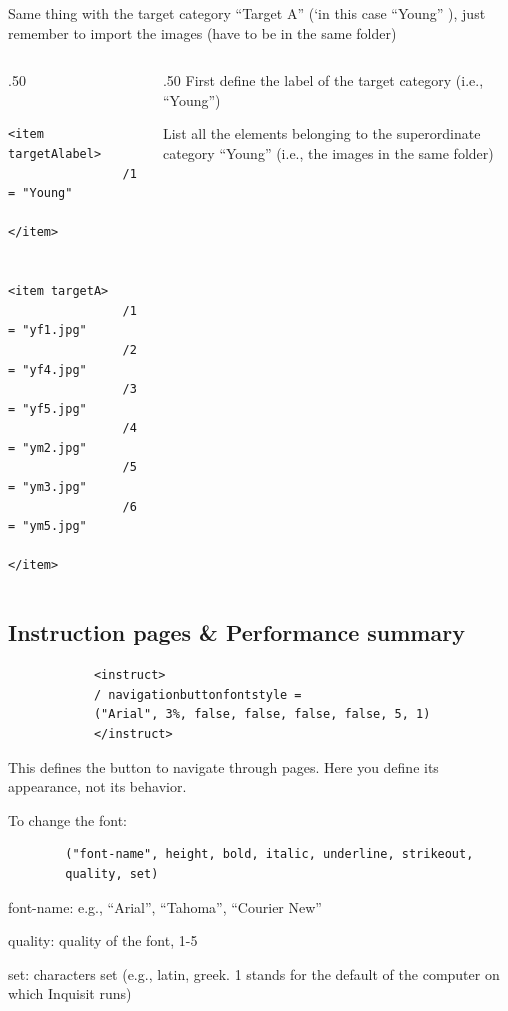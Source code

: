 \documentclass{beamer}
\begin{document}
\begin{frame}[fragile]
	Same thing with the target category ``Target A'' (`in this case ``Young'' ), just remember to import the images (have to be in the same folder)
	
	\begin{columns}
		\begin{column}[T]{.50\linewidth}
			\begin{small}
			\begin{verbatim}
				<item targetAlabel>
				/1 = "Young"
				</item>
				
				<item targetA>
				/1 = "yf1.jpg"
				/2 = "yf4.jpg"
				/3 = "yf5.jpg"
				/4 = "ym2.jpg"
				/5 = "ym3.jpg"
				/6 = "ym5.jpg"
				</item>
			\end{verbatim}
			\end{small}
		\end{column}
		
		\begin{column}[T]{.50\linewidth}
			\vspace{5mm}
			First define the label of the target category (i.e., ``Young'')
			
			\vspace{10mm}
			
			List all the elements belonging to the superordinate category ``Young'' (i.e., the images in the same folder)
		\end{column}
	\end{columns}
	
\end{frame}

\subsection*{Instruction pages \& Performance summary}

\begin{frame}[fragile]
		\begin{verbatim}
			<instruct>
			/ navigationbuttonfontstyle = 
			("Arial", 3%, false, false, false, false, 5, 1)
			</instruct>
		\end{verbatim}
	
	This defines the button to navigate through pages. Here you define its appearance, not its behavior. 
	
	To change the font:
	
	\begin{verbatim}
		("font-name", height, bold, italic, underline, strikeout, 
		quality, set)
	\end{verbatim}

font-name: e.g., ``Arial'', ``Tahoma'', ``Courier New''

quality: quality of the font, 1-5

set: characters set (e.g., latin, greek. 1 stands for the default of the computer on which Inquisit runs)
	\end{frame}
\end{document}

